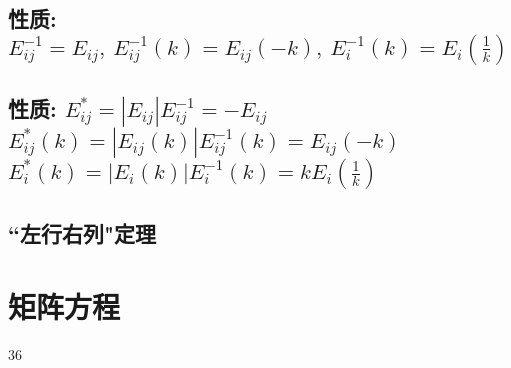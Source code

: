 \documentclass[UTF8]{ctexart}
\begin{document}
		\subsection{性质: $E_{ij}^{-1}=E_{ij},\ E_{ij}^{-1}\left( k \right) =E_{ij}\left( -k \right) ,\ E_{i}^{-1}\left( k \right) =E_i\left( \frac{1}{k} \right) $}
		
		\subsection{性质: $E_{ij}^{*}=\left| E_{ij} \right|E_{ij}^{-1}=-E_{ij}$ \\
			$E_{ij}^{*}\left( k \right) =\left| E_{ij}\left( k \right) \right|E_{ij}^{-1}\left( k \right) =E_{ij}\left( -k \right) 			$\\
			$E_{i}^{*}\left( k \right) =\left| E_i\left( k \right) \right|E_{i}^{-1}\left( k \right) =kE_i\left( \frac{1}{k} \right) 	$
		}
	
	
	\subsection{``左行右列"定理}
	
	
	
	\section{矩阵方程}
		
		
	
	36
	
	
	
	
	
	
	
	
	
	
	
	
\end{document}
